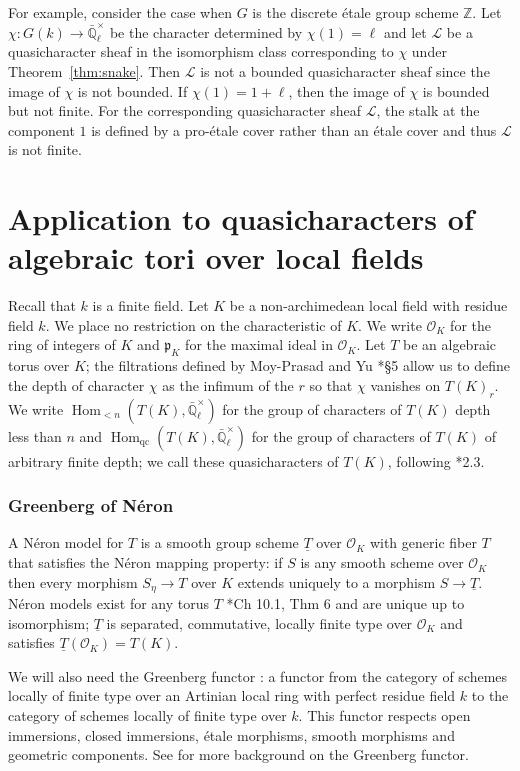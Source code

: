 \documentclass[11pt]{amsart}
\theoremstyle{plain}
\theoremstyle{definition}
\theoremstyle{remark}
\newcommand{\ZZ}{{\mathbb{Z}}}
\newcommand{\EE}{\mathbb{\bar Q}_\ell}
\newcommand{\OK}{\mathcal{O}_K}
\newcommand{\pK}{\mathfrak{p}_K}
\newcommand{\Fq}{k}
\newcommand{\EEx}{\EE^\times}
\DeclareMathOperator{\Hom}{Hom}
\newcommand{\TT}{\underline{T}}
\newcommand{\qcs}[1]{{\mathcal{#1}}}
\begin{document}
For example, consider the case when $G$ is the discrete \'etale group scheme $\ZZ$.
Let $\chi : G(\Fq) \to \EEx$ be the character determined by $\chi(1) = \ell$ 
and let $\qcs{L}$ be a quasicharacter sheaf in the isomorphism class 
corresponding to $\chi$ under Theorem~\ref{thm:snake}.
Then $\qcs{L}$ is not a bounded quasicharacter sheaf since the image of $\chi$ is not
bounded.  If $\chi(1) = 1+\ell$, then the image of $\chi$ is bounded but not finite.  For
the corresponding quasicharacter sheaf $\qcs{L}$, the stalk at the component $1$ is defined
by a pro-\'etale cover rather than an \'etale cover and thus $\qcs{L}$ is not finite.


\part{Application to quasicharacters of algebraic tori over local fields}

Recall that $\Fq$ is a finite field.
Let $K$ be a non-archimedean local field with residue field $\Fq$.
We place no restriction on the characteristic of $K$. 
We write $\OK$ for the ring of integers of $K$ and $\pK$ for the maximal ideal in $\OK$. 
Let $T$ be an algebraic torus over $K$; the filtrations defined by Moy-Prasad and Yu \cite{yu:03a}*{\S 5}
allow us to define the depth of character $\chi$ as the infimum of the $r$ so that $\chi$ vanishes on $T(K)_r$.
We write $\Hom_{< n}(T(K),\EEx)$ for the group of characters of $T(K)$ depth less than $n$ 
and $\Hom_{\text{qc}}(T(K),\EEx)$ for the group of characters of $T(K)$ of arbitrary finite depth;
we call these quasicharacters of $T(K)$, following \cite{tate:67a}*{2.3}.

\section{Greenberg of N\'eron}
\label{sec:GN}

A N\'eron model for $T$ is a smooth group scheme $\TT$ over $\OK$ with generic fiber $T$
that satisfies the N\'eron mapping property: if $S$ is any smooth scheme over $\OK$ then every morphism
$S_\eta \to T$ over $K$ extends uniquely to a morphism $S \to \TT$.  N\'eron models exist for any torus
$T$ \cite{bosch-lutkebohmert-reynaud:NeronModels}*{Ch 10.1, Thm 6} and are unique up to isomorphism;
$\TT$ is separated, commutative, locally finite type over $\OK$ and satisfies $\TT(\OK) = T(K)$.

We will also need the Greenberg functor :
a functor from the category of schemes locally of finite type 
over an Artinian local ring with perfect residue field $k$ 
to the category of schemes locally of finite type over $k$. 
This functor respects open immersions, closed immersions, \'etale morphisms, smooth morphisms and geometric components.
See
for more background on the Greenberg functor. 
\end{document}
